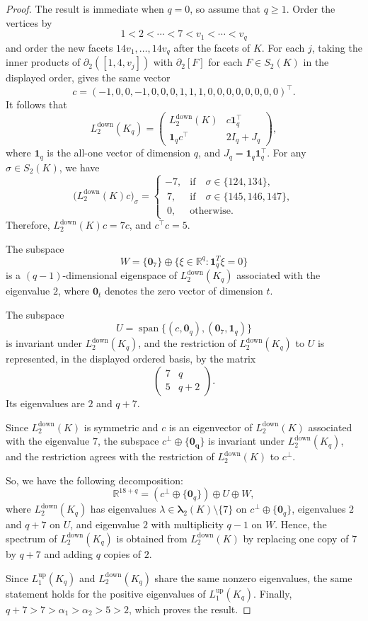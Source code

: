 \documentclass[12pt]{amsart}
\theoremstyle{plain}
\theoremstyle{definition}
\numberwithin{equation}{section}
\numberwithin{figure}{section}
\newcommand{\bflam}{\bm{\lambda}}
\newcommand{\Ldown}{L^{\operatorname{down}}}
\newcommand{\Lup}{L^{\operatorname{up}}}
\newcommand{\p}{\partial}
\newcommand{\R}{\mathbb R}
\begin{document}
\begin{proof}
The result is immediate when $q = 0$, so assume that $q \geq 1$.
Order the vertices by
\[
1<2<\cdots<7<v_1<\cdots<v_q
\]
and order the new facets $14v_1,\ldots,14v_q$ after the facets of $K$.
For each $j$, taking the inner products of $\p_2([1,4,v_j])$ with $\p_2 [F]$ for each $F \in S_2(K)$ in the displayed order, gives the same vector
\[
c=(-1,0,0,-1,0,0,0,1,1,1,0,0,0,0,0,0,0,0)^\top.
\]
It follows that
\[
\Ldown_2(K_q)
=
\begin{pmatrix}
\Ldown_2(K) & c\mathbf{1}_q^\top \\
\mathbf{1}_q c^\top & 2I_q + J_q
\end{pmatrix},
\]
where $\mathbf{1}_q$ is the all-one vector of dimension $q$, and $J_q = \mathbf{1}_q\mathbf{1}_q^\top$. 
For any $\sigma \in S_2(K)$, we have
\[
\bigl(\Ldown_2(K)c\bigr)_\sigma
=
\begin{cases}
-7, & \text{if ~ } \sigma \in \{124,134\},\\
~ 7, & \text{if ~ }\sigma \in \{145,146,147\},\\
~ 0, & \text{otherwise}.
\end{cases}
\]
Therefore, $\Ldown_2(K)c = 7c$, and  $c^\top c = 5$.

The subspace
\[
W = \{\mathbf{0}_7\} \oplus \{\xi \in \R^q : \mathbf{1}_q^T\xi = 0\}
\]
is a $(q - 1)$-dimensional eigenspace of $\Ldown_2(K_q)$ associated with the eigenvalue $2$, where $\mathbf{0}_t$ denotes the zero vector of dimension $t$.

The subspace
\[
U = \operatorname{span}\{(c,\mathbf{0}_q),(\mathbf{0}_7,\mathbf{1}_q)\}
\]
is invariant under $\Ldown_2(K_q)$, and the restriction of $\Ldown_2(K_q)$ to $U$ is represented, in the displayed ordered basis, by the matrix
\[
\begin{pmatrix}
7 & q \\
5 & q + 2
\end{pmatrix}.
\]
Its eigenvalues are $2$ and $q+7$.

Since $\Ldown_2(K)$ is symmetric and $c$ is an eigenvector of $\Ldown_2(K)$ associated with the eigenvalue $7$, the subspace $c^\perp\oplus\{\mathbf{0_q}\}$ is invariant under $\Ldown_2(K_q)$, and the restriction agrees with the restriction of $\Ldown_2(K)$ to $c^\perp$.

So, we have the following decomposition:
\[
\R^{18+q}
=
(c^\perp\oplus\{\mathbf{0}_q\})\oplus U\oplus W,
\]
where $\Ldown_2(K_q)$ has eigenvalues $\lambda \in \bflam_{2}(K) \setminus \{7\}$ on $c^\perp\oplus\{\mathbf{0}_q\}$, eigenvalues $2$ and $q+7$ on $U$, and eigenvalue $2$ with multiplicity $q-1$ on $W$.
Hence, the spectrum of $\Ldown_2(K_q)$ is obtained from $\Ldown_2(K)$ by replacing one copy of $7$ by $q+7$ and adding $q$ copies of $2$.

Since $\Lup_1(K_q)$ and $\Ldown_2(K_q)$ share the same nonzero eigenvalues, the same statement holds for the positive eigenvalues of $\Lup_1(K_q)$.
Finally, $q+7>7>\alpha_1>\alpha_2>5>2$, which proves the result.
\end{proof}
\end{document}
